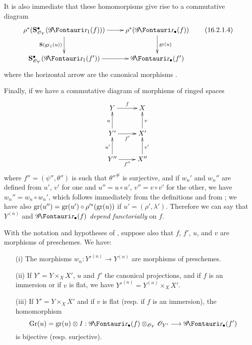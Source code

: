 \begin{env}[16.2.1]
It is also immediate that these homomorpisms give rise to a commutative diagram
\[
  \label{IV.16.2.1.4}
  \xymatrix{
    \rho^*(\bb{S}_{\sh{O}_Y}^\bullet(\shGr_1(f))) \ar[r] \ar[d]_-{\bb{S}(\gr_1(u))} & \rho^*(\shGr_\bullet(f)) \ar[d]^-{\gr(u)}\\
    \bb{S}_{\sh{O}_Y}^\bullet(\shGr_1(f')) \ar[r] & \shGr_\bullet(f')
  }
  \tag{16.2.1.4}
\]
where the horizontal arrow are the canonical morphisms .

Finally, if we have a commutative diagram of morphisms of ringed spaces
\[
  \xymatrix{
    Y \ar[r]^{f} & X \\
    Y' \ar[r]_{f'} \ar[u]^u & X' \ar[u]_v\\
    Y'' \ar[r]_{f''} \ar[u]^{u'} & X'' \ar[u]_{v'}\\
  }
\]
where $f'' = (\psi'', \theta'')$ is such that $\theta''^\#$ is surjective, and if $w_n'$ and $w_n''$ are defined from $u'$, $v'$ for one and $u'' = u \circ u'$, $v'' = v \circ v'$ for the other, we have $w_n'' = w_n \circ w_n'$, which follows immediately from the definitions and from ;
we have also $\operatorname{gr}(u'') = \operatorname{gr}(u') \circ \rho'^*(\operatorname{gr}(u))$ if $u' = (\rho', \lambda')$.
Therefore we can say that $Y^{(n)}$ and $\shGr_\bullet(f)$ \emph{depend functorially} on $f$. 
\end{env}

\begin{proposition}[16.2.2]
\label{IV.16.2.2}
With the notation and hypotheses of , suppose also that $f$, $f'$, $u$, and $v$ are morphisms of preschemes. We have:
\begin{enumerate}
  \item[{\rm(i)}] The morphisms $w_n:Y'^{(n)} \to Y^{(n)}$ are morphisms of preschemes.
  \item[{\rm(ii)}] If $Y' = Y \times_X X'$, $u$ and $f'$ the canonical projections, and if $f$ is an immersion or if $v$ is flat, we have $Y'^{(n)} = Y^{(n)} \times_X X'$.
  \item[{\rm(iii)}] If $Y' = Y \times_X X'$ and if $v$ is flat (resp. if $f$ is an immersion), the homomorphism 
  \[
    \Gr(u) = \gr(u)\otimes I : \shGr_\bullet(f)\otimes_{\sh{O}_Y}\sh{O}_{Y'} \to \shGr_\bullet(f')
  \]
  is bijective (resp. surjective).
\end{enumerate}
\end{proposition}


